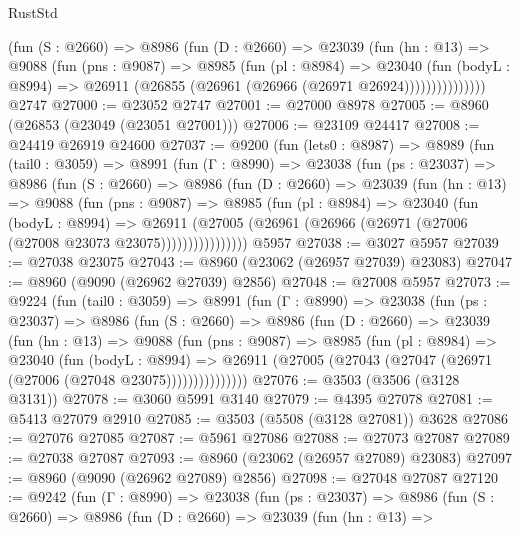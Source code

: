 \begin{lexlean}{RustStd}
\begin{coremodule}
              (fun (S : @2660) =>
              @8986
                (fun (D : @2660) =>
                @23039
                  (fun (hn : @13) =>
                  @9088
                    (fun (pns : @9087) =>
                    @8985
                      (fun (pl : @8984) =>
                      @23040
                        (fun (bodyL : @8994) =>
                        @26911 (@26855 (@26961 (@26966 (@26971 @26924)))))))))))))))
    @2747
@27000 := @23052 @2747
@27001 := @27000 @8978
@27005 := @8960 (@26853 (@23049 (@23051 @27001)))
@27006 := @23109 @24417
@27008 := @24419 @26919 @24600
@27037 := @9200
    (fun (lets0 : @8987) =>
    @8989
      (fun (tail0 : @3059) =>
      @8991
        (fun (Γ : @8990) =>
        @23038
          (fun (ps : @23037) =>
          @8986
            (fun (S : @2660) =>
            @8986
              (fun (D : @2660) =>
              @23039
                (fun (hn : @13) =>
                @9088
                  (fun (pns : @9087) =>
                  @8985
                    (fun (pl : @8984) =>
                    @23040
                      (fun (bodyL : @8994) =>
                      @26911
                        (@27005
                          (@26961 (@26966 (@26971 (@27006 (@27008 @23073 @23075))))))))))))))))
    @5957
@27038 := @3027 @5957
@27039 := @27038 @23075
@27043 := @8960 (@23062 (@26957 @27039) @23083)
@27047 := @8960 (@9090 (@26962 @27039) @2856)
@27048 := @27008 @5957
@27073 := @9224
    (fun (tail0 : @3059) =>
    @8991
      (fun (Γ : @8990) =>
      @23038
        (fun (ps : @23037) =>
        @8986
          (fun (S : @2660) =>
          @8986
            (fun (D : @2660) =>
            @23039
              (fun (hn : @13) =>
              @9088
                (fun (pns : @9087) =>
                @8985
                  (fun (pl : @8984) =>
                  @23040
                    (fun (bodyL : @8994) =>
                    @26911 (@27005 (@27043 (@27047 (@26971 (@27006 (@27048 @23075)))))))))))))))
@27076 := @3503 (@3506 (@3128 @3131))
@27078 := @3060 @5991 @3140
@27079 := @4395 @27078
@27081 := @5413 @27079 @2910
@27085 := @3503 (@5508 (@3128 @27081)) @3628
@27086 := @27076 @27085
@27087 := @5961 @27086
@27088 := @27073 @27087
@27089 := @27038 @27087
@27093 := @8960 (@23062 (@26957 @27089) @23083)
@27097 := @8960 (@9090 (@26962 @27089) @2856)
@27098 := @27048 @27087
@27120 := @9242
    (fun (Γ : @8990) =>
    @23038
      (fun (ps : @23037) =>
      @8986
        (fun (S : @2660) =>
        @8986
          (fun (D : @2660) =>
          @23039
            (fun (hn : @13) =>

\end{coremodule}
\end{lexlean}
